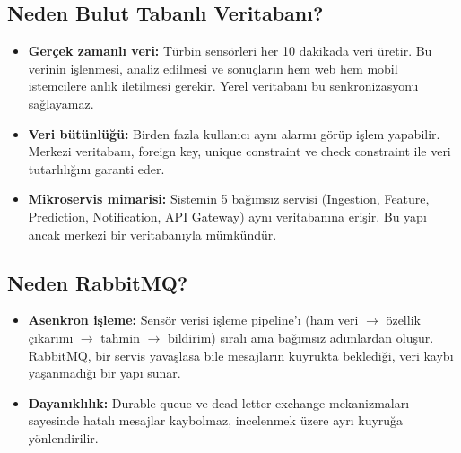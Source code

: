 \documentclass[12pt,a4paper]{article}
\begin{document}
\subsection{Neden Bulut Tabanl{\i} Veritaban{\i}?}

\begin{itemize}[leftmargin=1.5em, itemsep=0.3em]
    \item \textbf{Ger\c{c}ek zamanl{\i} veri:} T\"urbin sens\"orleri her 10 dakikada veri \"uretir. Bu verinin i\c{s}lenmesi, analiz edilmesi ve sonu\c{c}lar{\i}n hem web hem mobil istemcilere anl{\i}k iletilmesi gerekir. Yerel veritaban{\i} bu senkronizasyonu sa\u{g}layamaz.
    \item \textbf{Veri b\"ut\"unl\"u\u{g}\"u:} Birden fazla kullan{\i}c{\i} ayn{\i} alarm{\i} g\"or\"up i\c{s}lem yapabilir. Merkezi veritaban{\i}, foreign key, unique constraint ve check constraint ile veri tutarl{\i}l{\i}\u{g}{\i}n{\i} garanti eder.
    \item \textbf{Mikroservis mimarisi:} Sistemin 5 ba\u{g}{\i}ms{\i}z servisi (Ingestion, Feature, Prediction, Notification, API Gateway) ayn{\i} veritaban{\i}na eri\c{s}ir. Bu yap{\i} ancak merkezi bir veritaban{\i}yla m\"umk\"und\"ur.
\end{itemize}

\subsection{Neden RabbitMQ?}

\begin{itemize}[leftmargin=1.5em, itemsep=0.3em]
    \item \textbf{Asenkron i\c{s}leme:} Sens\"or verisi i\c{s}leme pipeline'{\i} (ham veri $\rightarrow$ \"ozellik \c{c}{\i}kar{\i}m{\i} $\rightarrow$ tahmin $\rightarrow$ bildirim) s{\i}ral{\i} ama ba\u{g}{\i}ms{\i}z ad{\i}mlardan olu\c{s}ur. RabbitMQ, bir servis yava\c{s}lasa bile mesajlar{\i}n kuyrukta bekledi\u{g}i, veri kayb{\i} ya\c{s}anmad{\i}\u{g}{\i} bir yap{\i} sunar.
    \item \textbf{Dayan{\i}kl{\i}l{\i}k:} Durable queue ve dead letter exchange mekanizmalar{\i} sayesinde hatal{\i} mesajlar kaybolmaz, incelenmek \"uzere ayr{\i} kuyru\u{g}a y\"onlendirilir.
\end{itemize}
\end{document}
